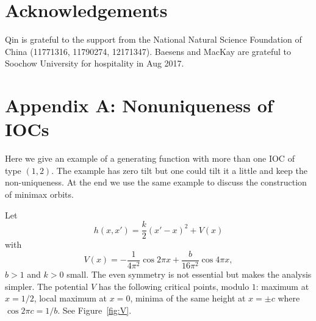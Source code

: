\documentclass[12pt]{article}
\newcounter{number}
\renewcommand{\thelemma}{\thesection.\thenumber}
\renewcommand{\theequation}{\arabic{section}.\arabic{equation}}
\begin{document}



\section*{Acknowledgements}
Qin is grateful to the support from the National Natural Science Foundation of China (11771316, 11790274, 12171347).
Baesens and MacKay are grateful to Soochow University for hospitality in Aug 2017.

\section*{Appendix A: Nonuniqueness of IOCs}
 \setcounter{theorem}{0}
 \setcounter{equation}{0}
 \setcounter{lemma}{0}
 \renewcommand{\theequation}{A.\arabic{equation}}
\renewcommand{\thelemma}{A.\arabic{lemma}}

Here we give an example of a generating function with more than one IOC of type $(1,2)$.  The example has zero tilt but one could tilt it a little and keep the non-uniqueness.  At the end we use the same example to discuss the construction of minimax orbits.

Let
$$h(x,x') = \frac{k}{2}(x'-x)^2 + V(x)$$ with
$$V(x)=-\frac{1}{4\pi^2}\cos{2\pi x} + \frac{b}{16\pi^2} \cos{4\pi x},$$
$b>1$ and $k>0$ small.
The even symmetry is not essential but makes the analysis simpler.
The potential $V$ has the following critical points, modulo $1$: maximum at $x=1/2$, local maximum at $x=0$, minima of the same height at $x = \pm c$ where $\cos{2\pi c} = 1/b$.  See Figure~\ref{fig:V}.
\end{document}
